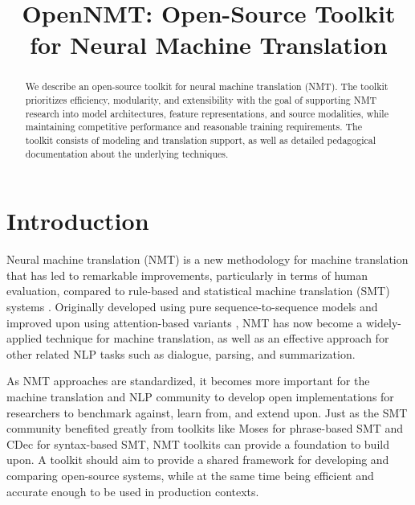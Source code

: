 \documentclass[]{article}
\begin{document}
\title{\bf OpenNMT: Open-Source Toolkit for Neural Machine Translation}  

\author{ \hfill {}
\AND
         \hfill {}
\AND
        \hfill {}
        \AND
        \hfill {}
        \AND
        \hfill {}
}

\maketitle
\pagestyle{empty}

\begin{abstract}
  We describe an open-source toolkit for neural machine translation
  (NMT).  The toolkit prioritizes efficiency, modularity, and
  extensibility with the goal of supporting NMT research into model
  architectures, feature representations, and source modalities, while
  maintaining competitive performance and reasonable training
  requirements. The toolkit consists of modeling and translation support,
  as well as detailed pedagogical documentation about the underlying
  techniques.
\end{abstract}

\section{Introduction}


Neural machine translation (NMT) is a new methodology for machine
translation that has led to remarkable improvements, particularly in
terms of human evaluation, compared to rule-based
and statistical machine translation (SMT) systems
\citep{wu2016google,systran}. Originally developed using pure
sequence-to-sequence models \citep{sutskever14sequence,Cho2014} and
improved upon using attention-based variants \citep{Bahdanau2015,Luong2015}, NMT has now become a widely-applied technique for machine
translation, as well as an effective approach for other related NLP
tasks such as dialogue, parsing, and summarization.

As NMT approaches are standardized, it becomes more important for the
machine translation and NLP community to develop open implementations
for researchers to benchmark against, learn from, and extend
upon. Just as the SMT community benefited greatly from toolkits like
Moses \citep{koehn2007moses} for phrase-based SMT and CDec
\citep{dyer2010cdec} for syntax-based SMT, NMT toolkits can provide a
foundation to build upon. A toolkit should aim to provide
a shared framework for developing and comparing open-source systems,
while at the same time being efficient and accurate enough to be used
in production contexts.
\end{document}
